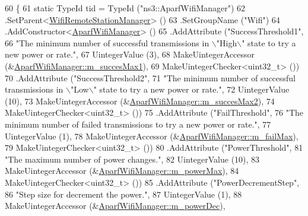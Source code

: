 \begin{DoxyCode}
60 \{
61   \textcolor{keyword}{static} TypeId tid = TypeId (\textcolor{stringliteral}{"ns3::AparfWifiManager"})
62     .SetParent<\hyperlink{classns3_1_1WifiRemoteStationManager_a78524840f5900e1937e8e2d6df48954d}{WifiRemoteStationManager}> ()
63     .SetGroupName (\textcolor{stringliteral}{"Wifi"})
64     .AddConstructor<\hyperlink{classns3_1_1AparfWifiManager_ad9b66cb3fdf2af298b42628892d09efd}{AparfWifiManager}> ()
65     .AddAttribute (\textcolor{stringliteral}{"SuccessThreshold1"},
66                    \textcolor{stringliteral}{"The minimum number of successful transmissions in \(\backslash\)"High\(\backslash\)" state to try a new power or
       rate."},
67                    UintegerValue (3),
68                    MakeUintegerAccessor (&\hyperlink{classns3_1_1AparfWifiManager_ab192aa4160ffefa93e47301ad682ccaa}{AparfWifiManager::m\_succesMax1}),
69                    MakeUintegerChecker<uint32\_t> ())
70     .AddAttribute (\textcolor{stringliteral}{"SuccessThreshold2"},
71                    \textcolor{stringliteral}{"The minimum number of successful transmissions in \(\backslash\)"Low\(\backslash\)" state to try a new power or
       rate."},
72                    UintegerValue (10),
73                    MakeUintegerAccessor (&\hyperlink{classns3_1_1AparfWifiManager_a8dc983de90c996a4ca0face8366f8bf7}{AparfWifiManager::m\_succesMax2}),
74                    MakeUintegerChecker<uint32\_t> ())
75     .AddAttribute (\textcolor{stringliteral}{"FailThreshold"},
76                    \textcolor{stringliteral}{"The minimum number of failed transmissions to try a new power or rate."},
77                    UintegerValue (1),
78                    MakeUintegerAccessor (&\hyperlink{classns3_1_1AparfWifiManager_a1619f19b03ae5c4fc5f9032a71380f3e}{AparfWifiManager::m\_failMax}),
79                    MakeUintegerChecker<uint32\_t> ())
80     .AddAttribute (\textcolor{stringliteral}{"PowerThreshold"},
81                    \textcolor{stringliteral}{"The maximum number of power changes."},
82                    UintegerValue (10),
83                    MakeUintegerAccessor (&\hyperlink{classns3_1_1AparfWifiManager_a4879816bad5b15bfadc1326a3b636477}{AparfWifiManager::m\_powerMax}),
84                    MakeUintegerChecker<uint32\_t> ())
85     .AddAttribute (\textcolor{stringliteral}{"PowerDecrementStep"},
86                    \textcolor{stringliteral}{"Step size for decrement the power."},
87                    UintegerValue (1),
88                    MakeUintegerAccessor (&\hyperlink{classns3_1_1AparfWifiManager_a802d7ed4d81a0f749afd4033950e0c31}{AparfWifiManager::m\_powerDec}),

\end{DoxyCode}
